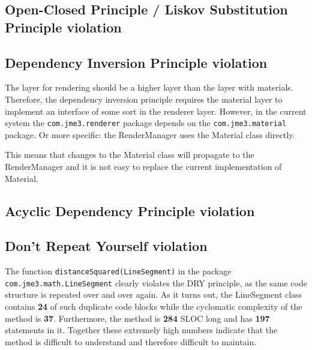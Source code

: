 \documentclass[a4paper, 10pt]{article}
\begin{document}
\subsection{Open-Closed Principle / Liskov Substitution Principle violation}
\label{sec:lsp_violation} %


\subsection{Dependency Inversion Principle violation}
\label{sec:dip_violation}
The layer for rendering should be a higher layer than the
layer with materials.
Therefore, the dependency inversion principle requires
the material layer to implement an interface of some sort
in the renderer layer.
However, in the current system the \verb|com.jme3.renderer| package 
depends on the \verb|com.jme3.material| package.
Or more specific: the RenderManager uses the Material class directly.

This means that changes to the Material class will propagate
to the RenderManager and it is not easy to replace the current
implementation of Material.

\subsection{Acyclic Dependency Principle violation}
\label{sec:adp_violation}


\subsection{Don't Repeat Yourself violation}
\label{sec:dry_violation}

The function \verb|distanceSquared(LineSegment)| in the package\\
\verb|com.jme3.math.LineSegment| clearly violates the DRY principle,
as the same code structure is repeated over and over again. As it turns
out, the LineSegment class contains \textbf{24} of such duplicate code
blocks while the cyclomatic complexity of the method is
\textbf{37}. Furthermore, the method is \textbf{284} SLOC long and has
\textbf{197} statements in it. Together these extremely high numbers
indicate that the method is difficult to understand and therefore
difficult to maintain.
\end{document}
